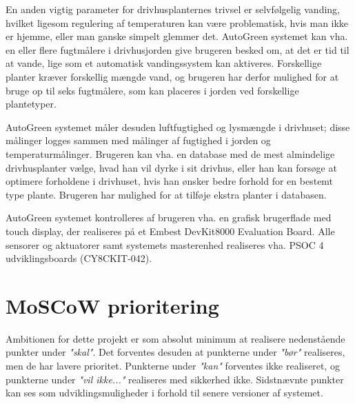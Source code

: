 En anden vigtig parameter for drivhusplanternes trivsel er selvfølgelig vanding, hvilket ligesom regulering af temperaturen kan være problematisk, hvis man ikke er hjemme, eller man ganske simpelt glemmer det. 
AutoGreen systemet kan vha. en eller flere fugtmålere i drivhusjorden give brugeren besked om, at det er tid til at vande, lige som et automatisk vandingssystem kan aktiveres. 
Forskellige planter kræver forskellig mængde vand, og brugeren har derfor mulighed for at bruge op til seks fugtmålere, som kan placeres i jorden ved forskellige plantetyper. 

AutoGreen systemet måler desuden luftfugtighed og lysmængde i drivhuset; disse målinger logges sammen med målinger af fugtighed i jorden og temperaturmålinger. 
Brugeren kan vha. en database med de mest almindelige drivhusplanter vælge, hvad han vil dyrke i sit drivhus, eller han kan forsøge at optimere forholdene i drivhuset, hvis han ønsker bedre forhold for en bestemt type plante.  
Brugeren har mulighed for at tilføje ekstra planter i databasen. 

AutoGreen systemet kontrolleres af brugeren vha. en grafisk brugerflade med touch display, der realiseres på et Embest DevKit8000 Evaluation Board. \cite{lib:DK8000}
Alle sensorer og aktuatorer samt systemets masterenhed realiseres vha. PSOC 4 udviklingsboards (CY8CKIT-042). \cite{lib:psoc4_guide}

\clearpage

\section{MoSCoW prioritering}
Ambitionen for dette projekt er som absolut minimum at realisere nedenstående punkter under \textit{"skal"}. 
Det forventes desuden at punkterne under \textit{"bør"} realiseres, men de har lavere prioritet.
Punkterne under \textit{"kan"} forventes ikke realiseret, og punkterne under \textit{"vil ikke..."} realiseres med sikkerhed ikke. 
Sidstnævnte punkter kan ses som udviklingsmuligheder i forhold til senere versioner af systemet. 

